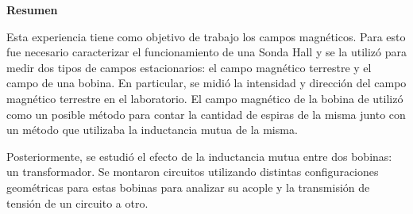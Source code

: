 \begin{titlepage}
\begin{center}
\large{\textbf{Resumen}}

\small{Esta experiencia tiene como objetivo de trabajo los campos magnéticos. Para esto fue necesario caracterizar el funcionamiento de una Sonda Hall y se la utilizó para medir dos tipos de campos estacionarios: el campo magnético terrestre y el campo de una bobina. En particular, se midió la intensidad y dirección del campo magnético terrestre en el laboratorio. El campo magnético de la bobina de utilizó como un posible método para contar la cantidad de espiras de la misma junto con un método que utilizaba la inductancia mutua de la misma.

Posteriormente, se estudió el efecto de la inductancia mutua entre dos bobinas: un transformador. Se montaron circuitos utilizando distintas configuraciones geométricas para estas bobinas para analizar su acople y la transmisión de tensión de un circuito a otro. } %

\end{center}



 

\vfill %

\end{titlepage}
%